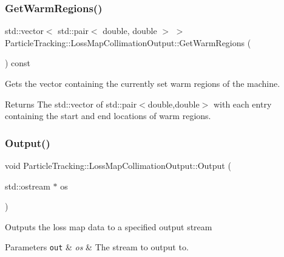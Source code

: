 \mbox{\label{classParticleTracking_1_1LossMapCollimationOutput_a0545aef555f123f8a94cd33af807e346}} 
\subsubsection{\texorpdfstring{Get\+Warm\+Regions()}{GetWarmRegions()}}
{\footnotesize\ttfamily std\+::vector$<$ std\+::pair$<$ double, double $>$ $>$ Particle\+Tracking\+::\+Loss\+Map\+Collimation\+Output\+::\+Get\+Warm\+Regions (\begin{DoxyParamCaption}{ }\end{DoxyParamCaption}) const}

Gets the vector containing the currently set warm regions of the machine. \begin{DoxyReturn}{Returns}
The std\+::vector of std\+::pair$<$double,double$>$ with each entry containing the start and end locations of warm regions. 
\end{DoxyReturn}
\mbox{\label{classParticleTracking_1_1LossMapCollimationOutput_a9e630f3568cc66c134720f72aa8bb7a4}} 
\subsubsection{\texorpdfstring{Output()}{Output()}}
{\footnotesize\ttfamily void Particle\+Tracking\+::\+Loss\+Map\+Collimation\+Output\+::\+Output (\begin{DoxyParamCaption}\item[{std\+::ostream $\ast$}]{os }\end{DoxyParamCaption})\hspace{0.3cm}{\ttfamily [virtual]}}

Outputs the loss map data to a specified output stream 
\begin{DoxyParams}[1]{Parameters}
\mbox{\tt out}  & {\em os} & The stream to output to. \\
\hline
\end{DoxyParams}


